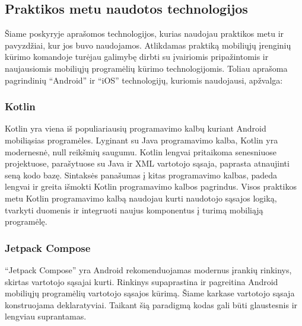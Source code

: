 \newpage

\subsection{Praktikos metu naudotos technologijos}
Šiame poskyryje aprašomos technologijos, kurias naudojau praktikos metu ir pavyzdžiai, kur jos buvo naudojamos. 
Atlikdamas praktiką mobiliųjų įrenginių kūrimo komandoje turėjau galimybę dirbti su įvairiomis pripažintomis ir naujausiomis mobiliųjų programėlių kūrimo technologijomis. Toliau aprašoma pagrindinių \enquote{Android} ir \enquote{iOS} technologijų, kuriomis naudojausi, apžvalga:

\subsubsection{Kotlin}
Kotlin yra viena iš populiariausių programavimo kalbų kuriant Android mobiliąsias programėles. Lyginant su Java programavimo kalba, Kotlin yra modernesnė, null reikšmių saugumu. Kotlin lengvai pritaikoma senesniuose projektuose, parašytuose su Java ir XML vartotojo sąsaja, paprasta atnaujinti seną kodo bazę. Sintaksės panašumas į kitas programavimo kalbas, padeda lengvai ir greita išmokti Kotlin programavimo kalbos pagrindus.
Visos praktikos metu Kotlin programavimo kalbą naudojau kurti naudotojo sąsajos logiką, tvarkyti duomenis ir integruoti naujus komponentus į turimą mobiliąją programėlę.

\subsubsection{Jetpack Compose}

\enquote{Jetpack Compose} yra Android rekomenduojamas modernus įrankių rinkinys, skirtas vartotojo sąsajai kurti. Rinkinys supaprastina ir pagreitina Android mobiliųjų programėlių vartotojo sąsajos kūrimą. Šiame karkase vartotojo sąsaja konstruojama deklaratyviai. Taikant šią paradigmą kodas gali būti glaustesnis ir lengviau suprantamas.


